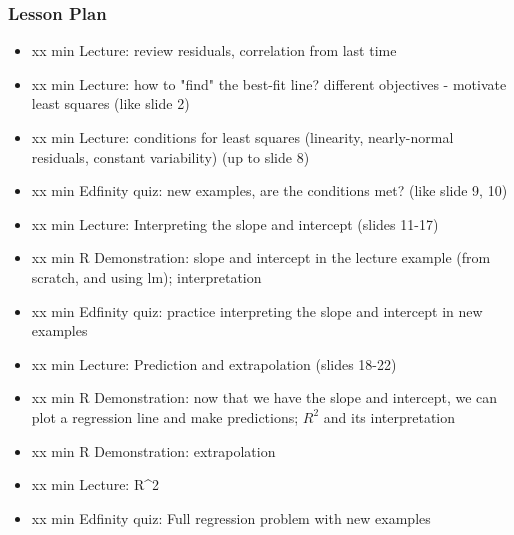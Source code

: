 \begin{frame}
    \frametitle{Lesson Plan}
    \begin{itemize}
        \item xx min Lecture: review residuals, correlation from last time
        \item xx min Lecture: how to "find" the best-fit line? different objectives - motivate least squares (like slide 2)
        \item xx min Lecture: conditions for least squares (linearity, nearly-normal residuals, constant variability) (up to slide 8)
        \item xx min Edfinity quiz: new examples, are the conditions met? (like slide 9, 10)
        \item xx min Lecture: Interpreting the slope and intercept (slides 11-17)
        \item xx min R Demonstration: slope and intercept in the lecture example (from scratch, and using lm); interpretation
        \item xx min Edfinity quiz: practice interpreting the slope and intercept in new examples
        \item xx min Lecture: Prediction and extrapolation (slides 18-22)
        \item xx min R Demonstration: now that we have the slope and intercept, we can plot a regression line and make predictions; $R^2$ and its interpretation
        \item xx min R Demonstration: extrapolation
        \item xx min Lecture: R^2
        \item xx min Edfinity quiz: Full regression problem with new examples
    \end{itemize}
\end{frame}


